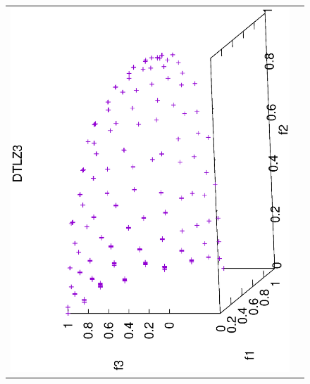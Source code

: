 \begin{figure}[H]
\begin{tabular}{cc}
  \includegraphics[scale=0.3, angle=-90,origin=c]{Figures_Chapter7/Results_Chapter4/Summary_Representative/VSD-MOEA-D/DTLZ3.eps} 
\end{tabular}
\end{figure}

